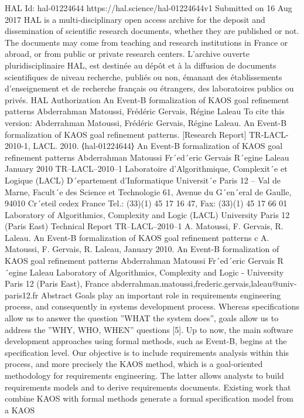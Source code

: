 HAL Id: hal-01224644
https://hal.science/hal-01224644v1
Submitted on 16 Aug 2017
HAL is a multi-disciplinary open access archive
for the deposit and dissemination of scientific research documents, whether they are published or not.
The documents may come from teaching and research
institutions in France or abroad, or from public or private research centers.
L’archive ouverte pluridisciplinaire HAL, est destinée au dépôt et à la diffusion de documents scientifiques de niveau recherche, publiés ou non, émanant
des établissements d’enseignement et de recherche
français ou étrangers, des laboratoires publics ou
privés.
HAL Authorization
An Event-B formalization of KAOS goal refinement patterns
Abderrahman Matoussi, Frédéric Gervais, Régine Laleau
To cite this version:
Abderrahman Matoussi, Frédéric Gervais, Régine Laleau. An Event-B formalization of KAOS goal refinement
patterns. [Research Report] TR-LACL-2010-1, LACL. 2010. ⟨hal-01224644⟩
An Event-B formalization of KAOS goal refinement
patterns
Abderrahman Matoussi Fr´ed´eric Gervais R´egine Laleau
January 2010
TR–LACL–2010–1
Laboratoire d’Algorithmique, Complexit´e et Logique (LACL)
D´epartement d’Informatique
Universit´e Paris 12 – Val de Marne, Facult´e des Science et Technologie
61, Avenue du G´en´eral de Gaulle, 94010 Cr´eteil cedex France
Tel.: (33)(1) 45 17 16 47, Fax: (33)(1) 45 17 66 01
Laboratory of Algorithmics, Complexity and Logic (LACL)
University Paris 12 (Paris East)
Technical Report TR–LACL–2010–1
A. Matoussi, F. Gervais, R. Laleau.
An Event-B formalization of KAOS goal refinement patterns
c A. Matoussi, F. Gervais, R. Laleau, January 2010.
An Event-B formalization of KAOS goal refinement patterns
Abderrahman Matoussi Fr´ed´eric Gervais R´egine Laleau
Laboratory of Algorithmics, Complexity and Logic - University Paris 12 (Paris East),
France
{abderrahman.matoussi,frederic.gervais,laleau}@univ-paris12.fr
Abstract
Goals play an important role in requirements engineering process, and consequently
in systems development process. Whereas specifications allow us to answer the question
”WHAT the system does”, goals allow us to address the ”WHY, WHO, WHEN” questions [5]. Up to now, the main software development approaches using formal methods,
such as Event-B, begins at the specification level. Our objective is to include requirements analysis within this process, and more precisely the KAOS method, which is a
goal-oriented methodology for requirements engineering. The latter allows analysts to
build requirements models and to derive requirements documents. Existing work that
combine KAOS with formal methods generate a formal specification model from a KAOS
